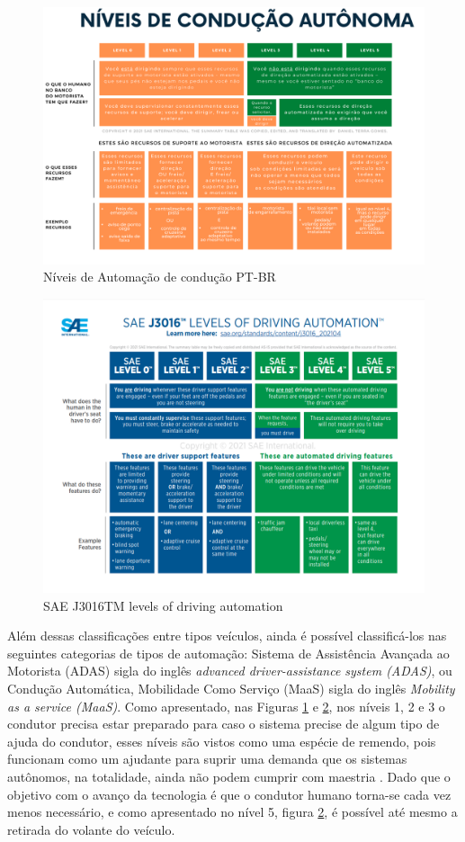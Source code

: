 \begin{figure}[H]
\centering
\includegraphics[width=15cm]{Figures/IC-Graph1.png}
\caption{Níveis de Automação de condução PT-BR}
\label{Graph_PT}
\end{figure}
\begin{figure}[H]
\centering
\includegraphics[width=15cm]{Figures/IC-GrapEN.png}
\caption{SAE J3016TM levels of driving automation \cite{SAE}}
\label{Graph_EN}
\end{figure}

Além dessas classificações entre tipos veículos, ainda é possível classificá-los nas seguintes categorias de tipos de automação: Sistema de Assistência Avançada ao Motorista (ADAS) sigla do inglês \textit{advanced driver-assistance system (ADAS)}, ou Condução Automática, Mobilidade Como Serviço (MaaS) sigla do inglês \textit{Mobility as a service (MaaS)}.
Como apresentado, nas Figuras \ref{Graph_PT} e \ref{Graph_EN}, nos níveis 1, 2 e 3 o condutor precisa estar preparado para caso o sistema precise de algum tipo de ajuda do condutor, esses níveis são vistos como uma espécie de remendo, pois funcionam como um ajudante para suprir uma demanda que os sistemas autônomos, na totalidade, ainda não podem cumprir com maestria \cite{4cenarios_ocidental}. Dado que o objetivo com o avanço da tecnologia é que o condutor humano torna-se cada vez menos necessário, e como apresentado no nível 5, figura \ref{Graph_EN}, é possível até mesmo a retirada do volante do veículo. 

